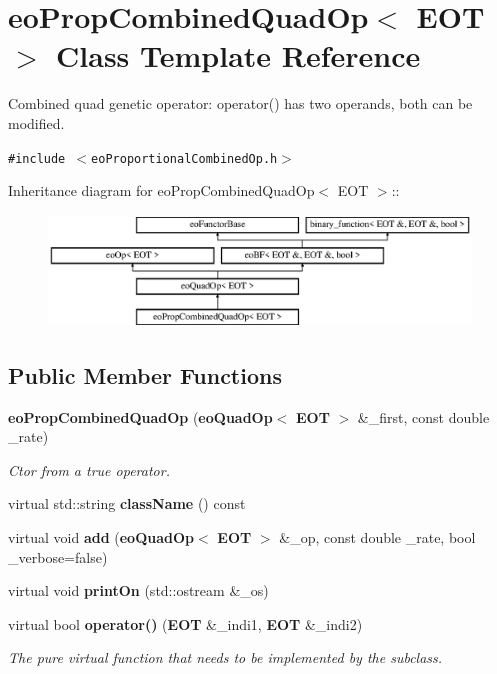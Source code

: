 \section{eo\-Prop\-Combined\-Quad\-Op$<$ EOT $>$ Class Template Reference}
\label{classeo_prop_combined_quad_op}
Combined quad genetic operator: operator() has two operands, both can be modified.  


{\tt \#include $<$eo\-Proportional\-Combined\-Op.h$>$}

Inheritance diagram for eo\-Prop\-Combined\-Quad\-Op$<$ EOT $>$::\begin{figure}[H]
\begin{center}
\leavevmode
\includegraphics[height=2.96296cm]{classeo_prop_combined_quad_op}
\end{center}
\end{figure}
\subsection*{Public Member Functions}
\begin{CompactItemize}
\item 
{\bf eo\-Prop\-Combined\-Quad\-Op} ({\bf eo\-Quad\-Op}$<$ {\bf EOT} $>$ \&\_\-first, const double \_\-rate)\label{classeo_prop_combined_quad_op_a0}

\begin{CompactList}\small\item\em Ctor from a true operator. \item\end{CompactList}\item 
virtual std::string {\bf class\-Name} () const \label{classeo_prop_combined_quad_op_a1}

\item 
virtual void {\bf add} ({\bf eo\-Quad\-Op}$<$ {\bf EOT} $>$ \&\_\-op, const double \_\-rate, bool \_\-verbose=false)\label{classeo_prop_combined_quad_op_a2}

\item 
virtual void {\bf print\-On} (std::ostream \&\_\-os)\label{classeo_prop_combined_quad_op_a3}

\item 
virtual bool {\bf operator()} ({\bf EOT} \&\_\-indi1, {\bf EOT} \&\_\-indi2)\label{classeo_prop_combined_quad_op_a4}

\begin{CompactList}\small\item\em The pure virtual function that needs to be implemented by the subclass. \item\end{CompactList}\end{CompactItemize}
